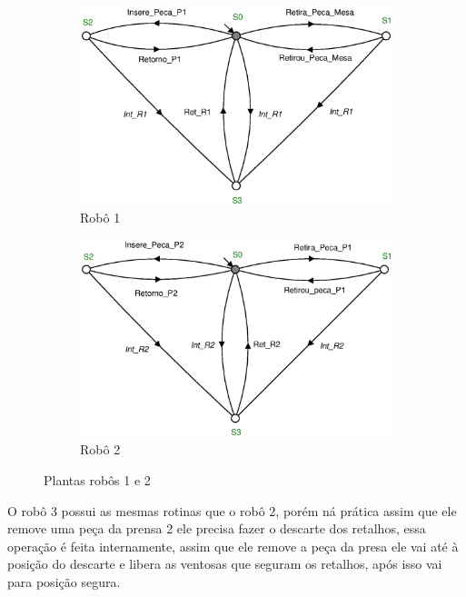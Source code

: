 \begin{figure}[H]%
  \centering
  \begin{subfigure}[b]{0.45\textwidth}
      \centering
      \includegraphics[width=\textwidth]{imagens/Robo_1.eps}
      \caption{Robô 1}
      \label{fig:robo1}
  \end{subfigure}
  \hfill
  \begin{subfigure}[b]{0.45\textwidth}
      \centering
      \includegraphics[width=\textwidth]{imagens/Robo_2.eps}
      \caption{Robô 2}
      \label{fig:robo2}
  \end{subfigure}
  \caption{Plantas robôs 1 e 2}
  \label{fig:robo12}
\end{figure}

O robô 3 possui as mesmas rotinas que o robô 2, porém ná prática assim que ele remove uma peça da prensa 2 ele precisa fazer o descarte dos retalhos, essa operação é feita internamente, assim que ele remove a peça da presa ele vai até à posição do descarte e libera as ventosas que seguram os retalhos, após isso vai para posição segura. 

